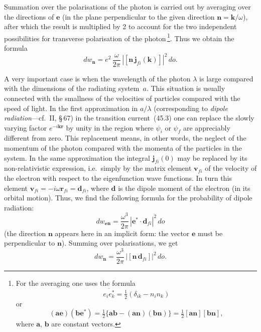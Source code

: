 Summation over the polarisations of the photon is carried out by averaging over the directions of $\mathbf{e}$ (in the plane perpendicular to the given direction $\mathbf{n} = \mathbf{k}/\omega$), after which the result is multiplied by 2 to account for the two independent possibilities for transverse polarisation of the photon\,\footnote{For the averaging one uses the formula
\begin{equation}
\overline{e_i e^*_k} = \tfrac{1}{2}(\delta_{ik} - n_i n_k)
\tag{45.4a}
\end{equation}
or
\begin{equation}
(\mathbf{a}\mathbf{e})(\mathbf{b}\mathbf{e}^*) = \tfrac{1}{2}\{\mathbf{a}\mathbf{b} - (\mathbf{a}\mathbf{n})(\mathbf{b}\mathbf{n})\} = \tfrac{1}{2}[\mathbf{a}\mathbf{n}][\mathbf{b}\mathbf{n}],
\tag{45.4b}
\end{equation}
where $\mathbf{a}$, $\mathbf{b}$ are constant vectors.}. Thus we obtain the formula
\begin{equation}
dw_\mathbf{n} = e^2\,\frac{\omega}{2\pi}\,|[\mathbf{n}\,\mathbf{j}_{fi}(\mathbf{k})]|^2\,do.
\tag{45.4}
\end{equation}

A very important case is when the wavelength of the photon $\lambda$ is large compared with the dimensions of the radiating system~$a$. This situation is usually connected with the smallness of the velocities of particles compared with the speed of light. In the first approximation in $a/\lambda$ (corresponding to \textit{dipole radiation}---cf.~II, \S\,67) in the transition current~(45.3) one can replace the slowly varying factor $e^{-i\mathbf{k}\mathbf{r}}$ by unity in the region where $\psi_i$ or $\psi_f$ are appreciably different from zero. This replacement means, in other words, the neglect of the momentum of the photon compared with the momenta of the particles in the system. In the same approximation the integral $\mathbf{j}_{fi}(0)$ may be replaced by its non-relativistic expression, i.e.\ simply by the matrix element $\mathbf{v}_{fi}$ of the velocity of the electron with respect to the eigenfunction wave functions. In turn this element $\mathbf{v}_{fi} = -i\omega\mathbf{r}_{fi} = \mathbf{d}_{fi}$, where $\mathbf{d}$ is the dipole moment of the electron (in its orbital motion). Thus, we find the following formula for the probability of dipole radiation:
\begin{equation}
dw_{\mathbf{en}} = \frac{\omega^3}{2\pi}\,|\mathbf{e}^*\cdot\mathbf{d}_{fi}|^2\,do
\tag{45.5}
\end{equation}
(the direction $\mathbf{n}$ appears here in an implicit form: the vector $\mathbf{e}$ must be perpendicular to $\mathbf{n}$). Summing over polarisations, we get
\begin{equation}
dw_\mathbf{n} = \frac{\omega^3}{2\pi}\,|[\mathbf{n}\,\mathbf{d}_{fi}]|^2\,do.
\tag{45.6}
\end{equation}

